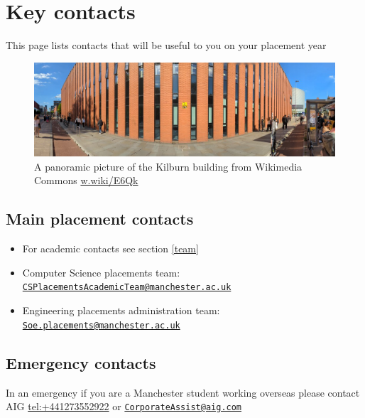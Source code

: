 \documentclass[
]{book}
\providecommand{\tightlist}{%
  \setlength{\itemsep}{0pt}\setlength{\parskip}{0pt}}
\begin{document}
\chapter{Key contacts}\label{contacts}

This page lists contacts that will be useful to you on your placement year

\begin{figure}

{\centering \includegraphics[width=1\linewidth]{images/kilburnarama} 

}

\caption{A panoramic picture of the Kilburn building from Wikimedia Commons \href{https://w.wiki/E6Qk}{w.wiki/E6Qk}}\label{fig:kilburn-fig}
\end{figure}



\section{Main placement contacts}\label{main}

\begin{itemize}
\tightlist
\item
  For academic contacts see section \ref{team}
\item
  Computer Science placements team: \href{mailto:CSPlacementsAcademicTeam@manchester.ac.uk}{\nolinkurl{CSPlacementsAcademicTeam@manchester.ac.uk}}
\item
  Engineering placements administration team: \href{mailto:Soe.placements@manchester.ac.uk}{\nolinkurl{Soe.placements@manchester.ac.uk}}
\end{itemize}

\section{Emergency contacts}\label{emergency}

In an emergency if you are a Manchester student working overseas please contact AIG \url{tel:+441273552922} or \href{mailto:CorporateAssist@aig.com}{\nolinkurl{CorporateAssist@aig.com}}
\end{document}
